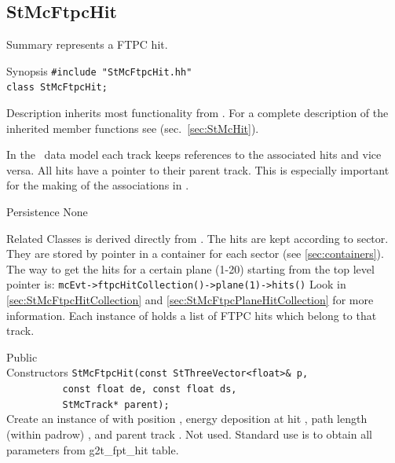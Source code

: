 \subsection{StMcFtpcHit}
 
\label{sec:StMcFtpcHit}
\begin{Entry}
\item[Summary]
     represents a FTPC hit.

\item[Synopsis]
    \verb+#include "StMcFtpcHit.hh"+\\
    \verb+class StMcFtpcHit;+\\

\item[Description]
     inherits most functionality from .  For a complete
    description of the inherited member functions see 
    (sec.~\ref{sec:StMcHit}).

    In the \StMcEvent\ data model each track keeps references to the
    associated hits and vice versa. All hits have a pointer to their
    parent track.  This is especially important for the making of the
    associations in \StAssociationMaker.


\item[Persistence]
    None

\item[Related Classes]
     is derived directly from .
    The hits are kept according to sector.
    They are stored by pointer in a container for each sector
    (see \ref{sec:containers}).  The way to get the hits for a
    certain plane (1-20) starting
    from the top level  pointer is:
    \verb+mcEvt->ftpcHitCollection()->plane(1)->hits()+
    Look in \ref{sec:StMcFtpcHitCollection} and
    \ref{sec:StMcFtpcPlaneHitCollection} for more information.
    Each instance of  holds a list of FTPC hits
    which belong to that track.

\item[Public\\ Constructors]
    \verb+StMcFtpcHit(const StThreeVector<float>& p,+\\
    \verb+          const float de, const float ds,+\\
    \verb+          StMcTrack* parent);+\\
    Create an instance of  with position ,
    energy deposition at hit , path length (within padrow) ,
    and parent track .  Not used.  Standard use is
    to obtain all parameters from g2t\_fpt\_hit table.


\end{Entry}
